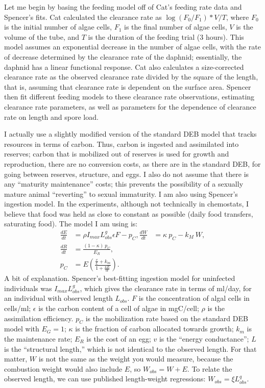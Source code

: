\documentclass[12pt,reqno,final,pdftex]{amsart}\usepackage[]{graphicx}\usepackage[]{color}
\theoremstyle{plain}
\numberwithin{equation}{part}
\begin{document}
Let me begin by basing the feeding model off of Cat's feeding rate data and Spencer's fits.
Cat calculated the clearance rate as $\log(F_0/F_1)*V/T$, where $F_0$ is the initial number of algae cells, $F_1$ is the final number of algae cells, $V$ is the volume of the tube, and $T$ is the duration of the feeding trial (3 hours).
This model assumes an exponential decrease in the number of algae cells, with the rate of decrease determined by the clearance rate of the daphnid; essentially, the daphnid has a linear functional response.
Cat also calculates a size-corrected clearance rate as the observed clearance rate divided by the square of the length, that is, assuming that clearance rate is dependent on the surface area.
Spencer then fit different feeding models to these clearance rate observations, estimating clearance rate parameters, as well as parameters for the dependence of clearance rate on length and spore load.

I actually use a slightly modified version of the standard DEB model that tracks resources in terms of carbon.
Thus, carbon is ingested and assimilated into reserves; carbon that is mobilized out of reserves is used for growth and reproduction, there are no conversion costs, as there are in the standard DEB, for going between reserves, structure, and eggs.
I also do not assume that there is any ``maturity maintenance'' costs; this prevents the possibility of a sexually mature animal ``reverting'' to sexual immaturity.
I am also using Spencer's ingestion model.
In the experiments, although not technically in chemostats, I believe that food was held as close to constant as possible (daily food transfers, saturating food).
The model I am using is:
\begin{align}
\frac{dE}{dt} &= \rho I_{max} L_{obs}^g \epsilon F - p_C,
\frac{dW}{dt} &= \kappa~p_C - k_M~W, \\
\frac{dR}{dt} &= \frac{(1-\kappa)~p_C}{E_R}, \\
p_C &= E \left(\frac{\frac{v}{L} + k_m}{1+\frac{\kappa E}{W}}\right).
\end{align}
A bit of explanation.
Spencer's best-fitting ingestion model for uninfected individuals was $I_{max} L_{obs}^g$, which gives the clearance rate in terms of ml/day, for an individual with observed length $L_{obs}$.
$F$ is the concentration of algal cells in cells/ml; $\epsilon$ is the carbon content of a cell of algae in mgC/cell; $\rho$ is the assimilation efficiency.
$p_C$ is the mobilization rate based on the standard DEB model with $E_G=1$; $\kappa$ is the fraction of carbon allocated towards growth; $k_m$ is the maintenance rate; $E_R$ is the cost of an egg; $v$ is the ``energy conductance''; $L$ is the ``structural length,'' which is not identical to the observed length.
For that matter, $W$ is not the same as the weight you would measure, because the combustion weight would also include $E$, so $W_{obs}=W+E$.
To relate the observed length, we can use published length-weight regressions: $W_{obs} = \xi L_{obs}^q$.
\end{document}
